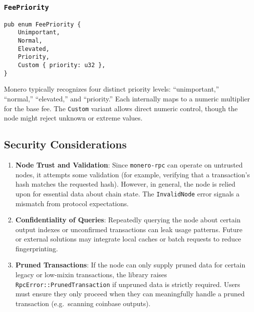 \documentclass[12pt,a4paper]{article}
\begin{document}
\subsubsection{\texttt{FeePriority}}
\label{sec:monero-rpc-supporting-types-feepriority}

\begin{verbatim}
pub enum FeePriority {
    Unimportant,
    Normal,
    Elevated,
    Priority,
    Custom { priority: u32 },
}
\end{verbatim}

Monero typically recognizes four distinct priority levels: “unimportant,”
“normal,” “elevated,” and “priority.”  Each internally maps to a numeric
multiplier for the base fee.  The \texttt{Custom} variant allows direct numeric
control, though the node might reject unknown or extreme values.

\subsection{Security Considerations}
\label{sec:monero-rpc-security}

\begin{enumerate}

    \item \textbf{Node Trust and Validation}: Since
    \texttt{monero-rpc} can operate on untrusted nodes, it attempts some
    validation (for example, verifying that a transaction’s hash matches the
    requested hash).  However, in general, the node is relied upon for essential
    data about chain state.  The \texttt{InvalidNode} error signals a mismatch
    from protocol expectations.


    \item \textbf{Confidentiality of Queries}: Repeatedly querying the node
    about certain output indexes or unconfirmed transactions can leak usage
    patterns.  Future or external solutions may integrate local caches or batch
    requests to reduce fingerprinting.

    \item \textbf{Pruned Transactions}: If the node can only supply pruned
    data for certain legacy or low-mixin transactions, the library raises
    \texttt{RpcError::PrunedTransaction} if unpruned data is strictly required.
    Users must ensure they only proceed when they can meaningfully handle a
    pruned transaction (e.g.\ scanning coinbase outputs).
\end{enumerate}
\end{document}

